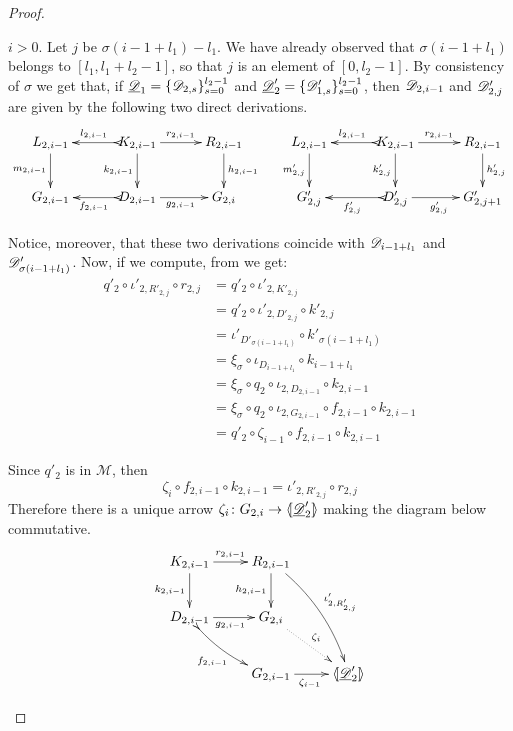 \begin{proof}
\begin{enumerate}
		\smallskip \noindent $i>0$.  Let $j$ be $\sigma(i-1+l_1)-l_1$. We have already observed that $\sigma(i-1+l_1)$ belongs to $[l_1, l_1+l_2-1]$, so that $j$ is an element of $[0, l_2-1]$.  By consistency of $\sigma$ we get that, if $\underline{\mathscr{D}}_1=\{\mathscr{D}_{2,s}\}_{s=0}^{l_2-1}$ and $\underline{\mathscr{D}}'_2=\{\mathscr{D}'_{1,s}\}_{s=0}^{l_2-1}$, then $\mathscr{D}_{2, i-1}$ and $\mathscr{D}'_{2, j}$ are given by the following two direct derivations.
		\[\xymatrix@C=30pt{L_{2,i-1} \ar[d]_{m_{2,i-1}} & K_{2,i-1} \ar[d]_{k_{2, i-1}} \ar[r]^{r_{2,i-1}} \ar@{>->}[l]_{l_{2,i-1}} & R_{2,i-1} \ar[d]^{h_{2,{i-1}}} & L_{2,i-1} \ar[d]_{m'_{2,j}} & K_{2,i-1}\ar[d]_{k'_{2, j}} \ar[r]^{r_{2,i-1}} \ar@{>->}[l]_{l_{2,i-1}}& R_{2,i-1} \ar[d]^{h'_{2, j}}\\ G_{2,i-1} & D_{2,i-1} \ar@{>->}[l]^{f_{2, i-1}} \ar[r]_{g_{2, i-1}} & G_{2,i} & G'_{2,j} & D'_{2,j}\ar@{>->}[l]^{f'_{2, j}} \ar[r]_{g'_{2, j}} & G'_{2,j+1} }\]
		
		Notice, moreover, that these two derivations coincide with $\mathscr{D}_{i-1+l_1}$ and  $\mathscr{D}'_{\sigma(i-1+l_1)}$.	Now, if we compute, from  we get:
		\begin{align*}
			q'_2\circ \iota'_{2, R'_{2, j}}\circ r_{2, j}&=q'_2\circ \iota'_{2, K'_{2,j}}\\&=q'_2\circ \iota'_{2,D'_{2,j}}\circ k'_{2,j}\\&= \iota'_{D'_{\sigma(i-1+l_1)}}\circ k'_{\sigma(i-1+l_1)}\\&=\xi_\sigma \circ \iota_{D_{i-1+l_1}} \circ k_{i-1+l_1}\\&=\xi_\sigma \circ q_2 \circ \iota_{2, D_{2,i-1}}\circ k_{2, i-1}\\&=\xi_\sigma \circ q_2 \circ \iota_{2, G_{2,i-1}}\circ f_{2,i-1}\circ k_{2,i-1}\\&=q'_2\circ \zeta_{i-1}\circ f_{2, i-1}\circ k_{2, i-1}
		\end{align*}
		
		Since $q'_2$ is in $\mathcal{M}$, then 
		\[\zeta_i\circ f_{2, i-1}\circ k_{2, i-1}=\iota'_{2, R'_{2, j}}\circ r_{2, j}\]
		Therefore there is a unique arrow $\zeta_i\colon G_{2, i}\to \langle \hspace{-1.85pt}[ \underline{\mathscr{D}}'_2]\hspace{-1.85pt}\rangle$ making the diagram below commutative.
		\[\xymatrix{K_{2, i-1} \ar[d]_{k_{2, i-1}} \ar[r]^{r_{2, i-1}} & R_{2,i-1} \ar[d]_{h_{2, i-1}} \ar@/^.3cm/[ddr]^{\iota'_{2, R'_{2,j}}}\\
		D_{2, i-1} \ar[r]_{g_{2, i-1}} \ar@/_.2cm/@{>->}[dr]_{f_{2, i-1}}& G_{2, i} \ar@{.>}[dr]^{\zeta_i} \\ &G_{2, i-1}\ar[r]_{\zeta_{i-1}}& \lpro \der{D}'_2\rpro}\] 
		

\end{enumerate}
\end{proof}

